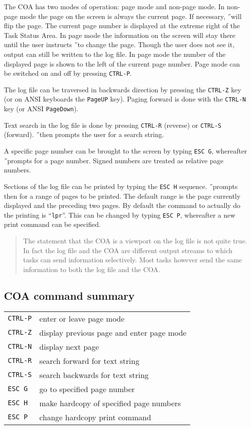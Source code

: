 The COA has two modes of operation: page mode and non-page mode.
In non-page mode the page on the screen is always the current page. 
If necessary, \H\ will flip the page. The current page number is displayed at
the extreme right of the Task Status Area.
In page mode the information on the screen will stay there until the user
instructs \H\ to change the page.
Though the user does not see it, output can still be written to the log file.
In page mode the number of the displayed
page is shown to the left of the current page number.
Page mode can be switched on and off by pressing {\tt CTRL-P}.

The log file can be traversed in backwards direction by pressing 
the {\tt CTRL-Z} key (or on ANSI keyboards the {\tt PageUP} key).
Paging forward is done with the {\tt CTRL-N} key 
(or ANSI {\tt PageDown}).

Text search in the log file is done by pressing {\tt CTRL-R} (reverse) or
{\tt CTRL-S} (forward). \H\ then prompts the user for a search string.

A specific page number can be brought to the screen by typing {\tt ESC G},
whereafter \H\ prompts for a page number. Signed numbers are treated as
relative page numbers.

Sections of the log file can be printed by typing the {\tt ESC H} sequence.
\H\ prompts then for a range of pages to be printed. The default range is
the page currently displayed and the preceding two pages.
By default the command to actually do the printing is ``{\tt lpr}''.
This can be changed by typing {\tt ESC P}, whereafter a new print command
can be specified.

\begin{quote}
\small
The statement that the COA is a viewport on the log file is not quite true.
In fact the log file and the COA are different output streams to which tasks
can send information selectively.
Most tasks however send the same information to both the log file and the COA.
\end{quote}

\subsection*{COA command summary}

\begin{tabular}{ll}
{\tt CTRL-P}&enter or leave page mode\\
{\tt CTRL-Z}&display previous page and enter page mode\\
{\tt CTRL-N}&display next page\\
{\tt CTRL-R}&search forward for text string\\
{\tt CTRL-S}&search backwards for text string\\
{\tt ESC G}&go to specified page number\\
{\tt ESC H}&make hardcopy of specified page numbers\\
{\tt ESC P}&change hardcopy print command\\
\end{tabular}

